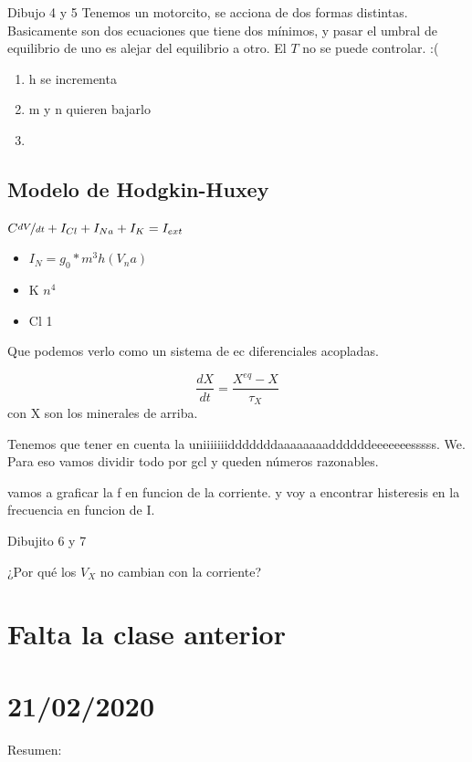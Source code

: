 Dibujo 4 y 5
Tenemos un motorcito, se acciona de dos formas distintas. Basicamente son dos ecuaciones que tiene dos mínimos, y pasar el umbral de equilibrio de uno es alejar del equilibrio a otro. El $T$ no se puede controlar. :(
\begin{enumerate}
	\item h se incrementa
	\item m y n quieren bajarlo
	\item 
\end{enumerate}

\subsection{Modelo  de Hodgkin-Huxey}

$C\nicefrac{dV}{dt} + I_{Cl} + I_{Na} + I_{K} = I_{ext}$

\begin{itemize}
	\item $I_N = g_0 * m^3 h (V_na)$
	\item K $n^4$
	\item Cl 1
\end{itemize}

Que podemos verlo como un sistema de ec diferenciales acopladas.

\begin{equation}
	\frac{dX}{dt} = \frac{X^{eq} - X}{\tau_X}
\end{equation}
con X son los minerales de arriba.

Tenemos que tener en cuenta la uniiiiiiidddddddaaaaaaaaddddddeeeeeeesssss. We. Para eso vamos dividir todo por gcl y queden números razonables.

vamos a graficar la f en funcion de la corriente.  y voy a encontrar histeresis en la frecuencia en funcion de I.

Dibujito 6 y 7 

¿Por qué los $V_X$ no cambian con la corriente? 



\section{Falta la clase anterior}


\section{21/02/2020}

Resumen:

